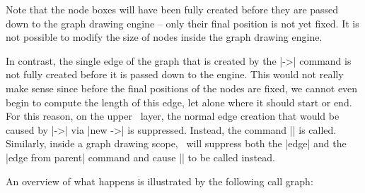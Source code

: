 Note that the node boxes will have been fully created before they are
passed down to the graph drawing engine -- only their final position
is not yet fixed. It is not possible to modify the size of nodes
inside the graph drawing engine. 

In contrast, the single edge of the graph that is created by the |->|
command is not fully created before it is passed down to the
engine. This would not really make sense since before the final
positions of the nodes are fixed, we cannot even begin to compute the
length of this edge, let alone where it should start or end. For this
reason, on the upper \tikzname\ layer, the normal edge creation that
would be caused by |->| via |new ->| is suppressed. Instead, the
command |\pgfgdedge| is called. Similarly, inside a graph drawing
scope, \tikzname\ will suppress both the |edge| and the
|edge from parent| command and cause |\pgfgdedge| to be called
instead. 

An overview of what happens is illustrated by the following call graph:

